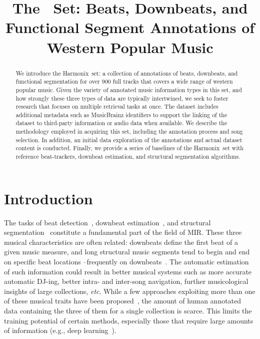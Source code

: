 \documentclass{article}
\title{The \setNameUpper~Set: Beats, Downbeats, and Functional Segment Annotations of Western Popular Music}
\newcommand{\setName}{Harmonix}
\begin{document}
%
\maketitle
%
\begin{abstract}
    We introduce the \setName~set: a collection of annotations of beats, downbeats, and functional segmentation for over 900 full tracks that covers a wide range of western popular music.
    Given the variety of annotated music information types in this set, and how strongly these three types of data are typically intertwined, we seek to foster research that focuses on multiple retrieval tasks at once.
    The dataset includes additional metadata such as MusicBrainz identifiers to support the linking of the dataset to third-party information or audio data when available.
    We describe the methodology employed in acquiring this set, including the annotation process and song selection. 
    In addition, an initial data exploration of the annotations and actual dataset content is conducted. 
    Finally, we provide a series of baselines of the \setName~set with reference beat-trackers, downbeat estimation, and structural segmentation algorithms.
\end{abstract}
%
\section{Introduction}\label{sec:introduction}

The tasks of beat detection~\cite{Ellis2007}, downbeat estimation~\cite{Bock2016}, and structural segmentation~\cite{Paulus2010} constitute a fundamental part of the field of MIR.
These three musical characteristics are often related: downbeats define the first beat of a given music measure, and long structural music segments tend to begin and end on specific beat locations --frequently on downbeats~\cite{Foote1999}.
The automatic estimation of such information could result in better musical systems such as more accurate automatic DJ-ing, better intra- and inter-song navigation, further musicological insights of large collections, \emph{etc}.
While a few approaches exploiting more than one of these musical traits have been proposed~\cite{Bock2016, Mccallum2019, Fuentes2019}, the amount of human annotated data containing the three of them for a single collection is scarce.
This limits the training potential of certain methods, especially those that require large amounts of information (e.g., deep learning~\cite{Humphrey2012}).
\end{document}

